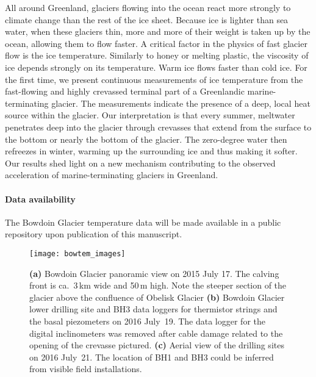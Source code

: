 \documentclass[utf8]{article}
\begin{document}
    All around Greenland, glaciers flowing into the ocean react more strongly
    to climate change than the rest of the ice sheet. Because ice is lighter
    than sea water, when these glaciers thin, more and more of their weight is
    taken up by the ocean, allowing them to flow faster. A critical factor in
    the physics of fast glacier flow is the ice temperature. Similarly to honey
    or melting plastic, the viscosity of ice depends strongly on its
    temperature. Warm ice flows faster than cold ice.
    For the first time, we present continuous measurements of ice
    temperature from the fast-flowing and highly crevassed terminal part of a
    Greenlandic marine-terminating glacier. The measurements indicate the
    presence of a deep, local heat source within the glacier. Our
    interpretation is that every summer, meltwater penetrates deep into the
    glacier through crevasses that extend from the surface to the bottom or
    nearly the bottom of the glacier. The zero-degree water then refreezes in
    winter, warming up the surrounding ice and thus making it softer.
    Our results shed light on a new mechanism contributing to the observed
    acceleration of marine-terminating glaciers in Greenland.

\paragraph{Data availability}

    The Bowdoin Glacier temperature data will be made available in a public
    repository upon publication of this manuscript.







\clearpage

    \begin{figure}
      \centerline{\texttt{[image: bowtem\_images]}}
      \caption{%
        \textbf{(a)} Bowdoin Glacier panoramic view on 2015 July 17. The
          calving front is ca.~3\,km wide and 50\,m high. Note the steeper
          section of the glacier above the confluence of Obelisk Glacier
        \textbf{(b)} Bowdoin Glacier lower drilling site and BH3 data loggers
          for thermistor strings and the basal piezometers on 2016 July~19. The
          data logger for the digital inclinometers was removed after cable
          damage related to the opening of the crevasse pictured.
        \textbf{(c)} Aerial view of the drilling sites on 2016 July~21. The
          location of BH1 and BH3 could be inferred from visible field
          installations.}
      \label{fig:images}
    \end{figure}
\end{document}
